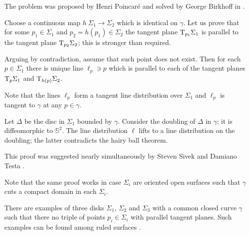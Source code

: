 The problem was proposed by Henri Poincar\'e \cite[see][]{poincare}
and solved by George Birkhoff in \cite{birkhoff}.



 






Choose a continuous map $h\:\Sigma_1\to \Sigma_2$
which is identical on $\gamma$.
Let us prove that for some $p_1\in \Sigma_1$ and $p_2=h(p_1)\in \Sigma_2$
the tangent plane $\mathrm{T}_{p_1} \Sigma_1$ is parallel to the tangent plane $\mathrm{T}_{p_2} \Sigma_2$;
this is stronger than required.

Arguing by contradiction,
assume that such point does not exist.
Then for each $p\in\Sigma_1$
there is unique line $\ell_p\ni p$ 
which is parallel to each of the tangent planes $\mathrm{T}_{p} \Sigma_1$ and $\mathrm{T}_{h(p)} \Sigma_2$.

Note that the lines $\ell_p$ form a tangent line distribution over $\Sigma_1$
and $\ell_p$ is tangent to $\gamma$ at any $p\in\gamma$.

Let $\Delta$ be the disc in $\Sigma_1$ bounded by $\gamma$.
Consider the doubling of $\Delta$ in $\gamma$;
it is diffeomorphic to $\mathbb S^2$.
The line distribution $\ell$ lifts to a line distribution on the doubling;
the latter contradicts the hairy ball theorem.\qeds


This proof was suggested nearly simultaneously 
by Steven Sivek 
and Damiano Testa \cite[see][]{two-discs}.

Note that the same proof works in case $\Sigma_i$ are oriented open surfaces such that $\gamma$ cuts a compact domain in each $\Sigma_i$.

There are examples of three disks $\Sigma_1$, $\Sigma_2$ and $\Sigma_3$
with a common closed curve $\gamma$ such that there 
no triple of points $p_i\in\Sigma_i$ with parallel tangent planes.
Such examples can be found among ruled surfaces \cite[see][]{three-discs}.